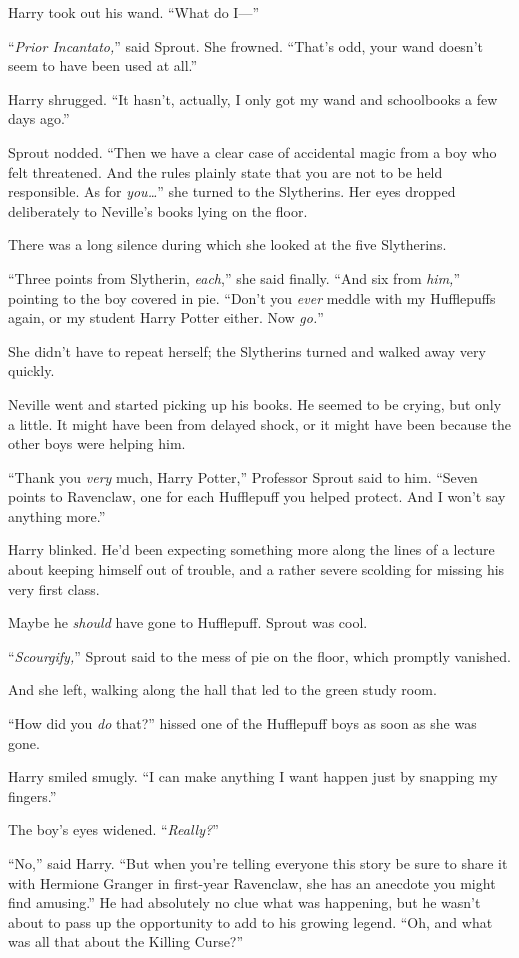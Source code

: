 Harry took out his wand. “What do I—”

“\emph{Prior Incantato,}” said Sprout. She frowned. “That’s odd, your wand doesn’t seem to have been used at all.”

Harry shrugged. “It hasn’t, actually, I only got my wand and schoolbooks a few days ago.”

Sprout nodded. “Then we have a clear case of accidental magic from a boy who felt threatened. And the rules plainly state that you are not to be held responsible. As for \emph{you…}” she turned to the Slytherins. Her eyes dropped deliberately to Neville’s books lying on the floor.

There was a long silence during which she looked at the five Slytherins.

“Three points from Slytherin, \emph{each},” she said finally. “And six from \emph{him,}” pointing to the boy covered in pie. “Don’t you \emph{ever} meddle with my Hufflepuffs again, or my student Harry Potter either. Now \emph{go.}”

She didn’t have to repeat herself; the Slytherins turned and walked away very quickly.

Neville went and started picking up his books. He seemed to be crying, but only a little. It might have been from delayed shock, or it might have been because the other boys were helping him.

“Thank you \emph{very} much, Harry Potter,” Professor Sprout said to him. “Seven points to Ravenclaw, one for each Hufflepuff you helped protect. And I won’t say anything more.”

Harry blinked. He’d been expecting something more along the lines of a lecture about keeping himself out of trouble, and a rather severe scolding for missing his very first class.

Maybe he \emph{should} have gone to Hufflepuff. Sprout was cool.

“\emph{Scourgify,}” Sprout said to the mess of pie on the floor, which promptly vanished.

And she left, walking along the hall that led to the green study room.

“How did you \emph{do} that?” hissed one of the Hufflepuff boys as soon as she was gone.

Harry smiled smugly. “I can make anything I want happen just by snapping my fingers.”

The boy’s eyes widened. “\emph{Really?}”

“No,” said Harry. “But when you’re telling everyone this story be sure to share it with Hermione Granger in first-year Ravenclaw, she has an anecdote you might find amusing.” He had absolutely no clue what was happening, but he wasn’t about to pass up the opportunity to add to his growing legend. “Oh, and what was all that about the Killing Curse?”

